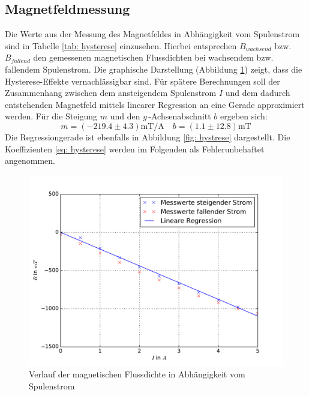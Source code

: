 \subsection{Magnetfeldmessung}
Die Werte aus der Messung des Magnetfeldes in Abhängigkeit vom Spulenstrom sind in Tabelle \ref{tab: hysterese} einzusehen.
Hierbei entsprechen $B_{wachsend}$ bzw. $B_{fallend}$ den gemessenen magnetischen Flussdichten bei wachsendem
bzw. fallendem Spulenstrom.
Die graphische Darstellung (Abbildung \ref{fig: hysterese}) zeigt, dass die Hysterese-Effekte vernachlässigbar sind. Für
spätere Berechnungen soll der Zusammenhang zwischen dem ansteigendem Spulenstrom $I$ und dem dadurch entstehenden
Magnetfeld mittels linearer Regression an eine Gerade approximiert werden. Für die Steigung $m$ und den $y\,$-Achsenabschnitt $b$ ergeben sich:
\begin{equation}
  m = (-219.4 \pm 4.3) \si{\milli\tesla \per \ampere} \quad b =  (1.1 \pm 12.8) \si{\milli\tesla}
  \label{eq: hysterese}
\end{equation}
Die Regressiongerade ist ebenfalls in Abbildung \ref{fig: hystrese} dargestellt. Die Koeffizienten \eqref{eq: hysterese} werden im Folgenden
als Fehlerunbehaftet angenommen.

\begin{figure}
  \centering
  \includegraphics[width=\textwidth]{pics/hysterese.pdf}
  \caption{Verlauf der magnetischen Flussdichte in Abhängigkeit vom Spulenstrom}
  \label{fig: hysterese}
\end{figure}




